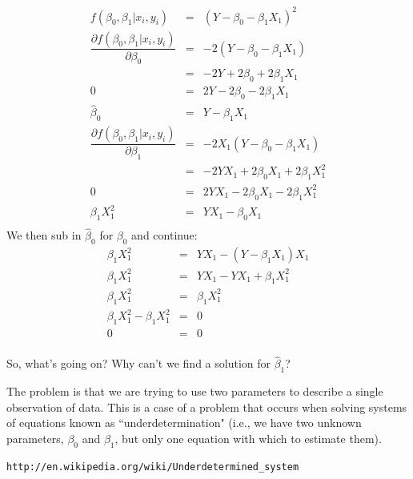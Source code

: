 \documentclass[10pt]{amsart}
\begin{document}
 \begin{eqnarray*}
 f(\beta_0, \beta_1 | x_i, y_i) &=& (Y - \beta_0 - \beta_1 X_1 )^2\\
\dfrac{\partial{ f(\beta_0, \beta_1 | x_i, y_i)}}{\partial \beta_0} &=& -2(Y - \beta_0 - \beta_1X_1)\\
&=& -2Y + 2\beta_0 + 2\beta_1 X_1\\
0 &=& 2Y - 2\beta_0 - 2\beta_1 X_1\\
\hat \beta_0 &=& Y - \beta_1X_1\\
\dfrac{\partial{ f(\beta_0, \beta_1 | x_i, y_i)}}{\partial \beta_1} &=& -2 X_1( Y - \beta_0 - \beta_1 X_1)\\
&=&  -2YX_1 + 2\beta_0 X_1 + 2\beta_1 X_1^2\\
0 &=& 2YX_1 - 2\beta_0 X_1 - 2\beta_1 X_1^2\\
\beta_1 X_1^2 &=& YX_1 - \beta_0 X_1\\
\end{eqnarray*}
We then sub in $\hat \beta_0$ for $\beta_0$ and continue:
\begin{eqnarray*}
\beta_1 X_1^2 &=& YX_1 - (Y - \beta_1X_1)X_1\\
\beta_1 X_1^2 &=& YX_1 - YX_1 + \beta_1 X_1^2\\
\beta_1 X_1^2  &=& \beta_1 X_1^2\\
\beta_1 X_1^2  - \beta_1 X_1^2 &=& 0\\
0 &=& 0\\
 \end{eqnarray*}
 
 So, what's going on? Why can't we find a solution for $ \hat \beta_1$?
 
 The problem is that we are trying to use two parameters to describe a single observation of data. This is a case of a problem that occurs when solving systems of equations known as ``underdetermination" (i.e., we have two unknown parameters, $\beta_0$ and $\beta_1$, but only one equation with which to estimate them).\\
 
 \begin{verbatim}http://en.wikipedia.org/wiki/Underdetermined_system\end{verbatim}
 
\end{document}
